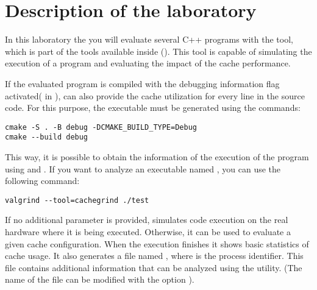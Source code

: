 \section{Description of the laboratory}

In this laboratory the you will evaluate several C++ programs  with
 the tool, which is part of the tools available inside
 (). This tool is
capable of simulating the execution of a program and evaluating the impact of
the cache performance. 

If the evaluated program is compiled with the debugging information flag
activated( in ),  can also
provide the cache utilization for every line in the source code. For this
purpose, the executable must be generated using the commands:

\begin{lstlisting}[style=terminal,aboveskip=1em,belowskip=1em]
cmake -S . -B debug -DCMAKE_BUILD_TYPE=Debug
cmake --build debug
\end{lstlisting}

\vspace{1em}

This way, it is possible to obtain the information of the execution of the
program using  and . If you want
to analyze an executable named , you can use the following
command:

\begin{lstlisting}[style=terminal,aboveskip=1em,belowskip=1em]
valgrind --tool=cachegrind ./test
\end{lstlisting}

\vspace{1em}

If no additional parameter is provided,  simulates code
execution on the real hardware where it is being executed. Otherwise,
it can be used to evaluate a given cache configuration.
When the execution finishes it shows basic statistics of cache usage.
It also generates a file named ,
where  is the process identifier. 
This file contains additional information that can be analyzed using the 
 utility. 
(The name of the file can be modified with the option
).

